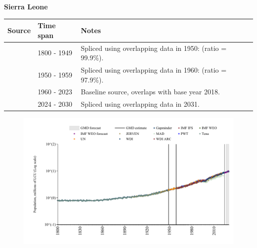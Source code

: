 \documentclass[12pt,a4paper,landscape]{article}
\begin{document}
\begin{adjustbox}{max totalsize={\paperwidth}{\paperheight},center}
\begin{minipage}[t][\textheight][t]{\textwidth}
\vspace*{0.5cm}
{}
\begin{center}
{\Large\bfseries Sierra Leone}
\end{center}
\vspace{0.5cm}
\begin{table}[H]
\centering
\small
\begin{tabular}{|l|l|l|}
\hline
\textbf{Source} & \textbf{Time span} & \textbf{Notes} \\
\hline
\rowcolor{white}\cite{Gapminder}& 1800 - 1949 &Spliced using overlapping data in 1950: (ratio = 99.9\%).\\
\rowcolor{lightgray}\cite{IMF_IFS}& 1950 - 1959 &Spliced using overlapping data in 1960: (ratio = 97.9\%).\\
\rowcolor{white}\cite{WDI}& 1960 - 2023 &Baseline source, overlaps with base year 2018.\\
\rowcolor{lightgray}\cite{Gapminder}& 2024 - 2030 &Spliced using overlapping data in 2031.\\
\hline
\end{tabular}
\end{table}
\begin{figure}[H]
\centering
\includegraphics[width=\textwidth,height=0.6\textheight,keepaspectratio]{graphs/SLE_pop.pdf}
\end{figure}
\end{minipage}
\end{adjustbox}
\end{document}
